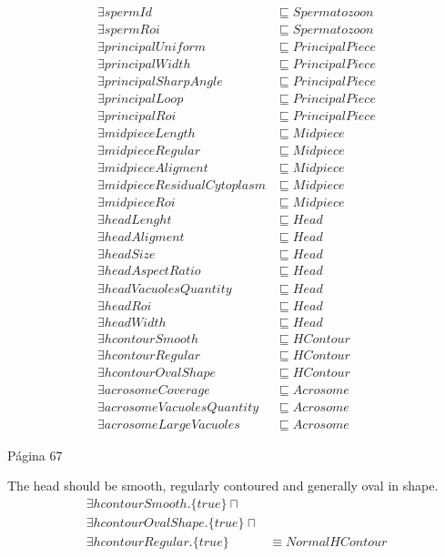 \documentclass{article}
\begin{document}
\begin{align*}
\exists spermId &\sqsubseteq Spermatozoon\\
\exists spermRoi &\sqsubseteq Spermatozoon\\
\exists principalUniform &\sqsubseteq PrincipalPiece\\
\exists principalWidth &\sqsubseteq PrincipalPiece\\
\exists principalSharpAngle &\sqsubseteq PrincipalPiece\\
\exists principalLoop &\sqsubseteq PrincipalPiece\\
\exists principalRoi &\sqsubseteq PrincipalPiece\\
\exists midpieceLength &\sqsubseteq Midpiece\\
\exists midpieceRegular &\sqsubseteq Midpiece\\
\exists midpieceAligment &\sqsubseteq Midpiece\\
\exists midpieceResidualCytoplasm &\sqsubseteq Midpiece\\
\exists midpieceRoi &\sqsubseteq Midpiece\\
\exists headLenght &\sqsubseteq Head\\
\exists headAligment &\sqsubseteq Head\\
\exists headSize &\sqsubseteq Head\\
\exists headAspectRatio &\sqsubseteq Head\\
\exists headVacuolesQuantity &\sqsubseteq Head\\
\exists headRoi &\sqsubseteq Head\\
\exists headWidth &\sqsubseteq Head\\
\exists hcontourSmooth &\sqsubseteq HContour\\
\exists hcontourRegular &\sqsubseteq HContour\\
\exists hcontourOvalShape &\sqsubseteq HContour\\
\exists acrosomeCoverage &\sqsubseteq Acrosome\\
\exists acrosomeVacuolesQuantity &\sqsubseteq Acrosome\\
\exists acrosomeLargeVacuoles &\sqsubseteq Acrosome
\end{align*}

Página 67

The head should be smooth, regularly contoured and generally oval in shape. 
\begin{align*}
\exists hcontourSmooth.\{true\} \sqcap &\\
\exists hcontourOvalShape.\{true\} \sqcap &\\
\exists hcontourRegular.\{true\}& \equiv NormalHContour
\end{align*}
\end{document}
